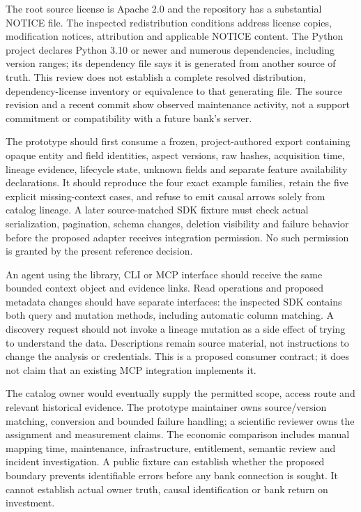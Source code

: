 The root source license is Apache 2.0 and the repository has a substantial
NOTICE file. The inspected redistribution conditions address license copies,
modification notices, attribution and applicable NOTICE content. The Python
project declares Python 3.10 or newer and numerous dependencies, including
version ranges; its dependency file says it is generated from another source
of truth. This review does not establish a complete resolved distribution,
dependency-license inventory or equivalence to that generating file. The
source revision and a recent commit show observed maintenance activity, not
a support commitment or compatibility with a future bank's server.
\citep{exec16_dh_rights}

The prototype should first consume a frozen, project-authored export containing
opaque entity and field identities, aspect versions, raw hashes, acquisition
time, lineage evidence, lifecycle state, unknown fields and separate feature
availability declarations. It should reproduce the four exact example families,
retain the five explicit missing-context cases, and refuse to emit causal arrows
solely from catalog lineage. A later source-matched SDK fixture must check
actual serialization, pagination, schema changes, deletion visibility and
failure behavior before the proposed adapter receives integration permission.
No such permission is granted by the present reference decision.
\citep{exec16_dh_contract}

An agent using the library, CLI or MCP interface should receive the same
bounded context object and evidence links. Read operations and proposed metadata
changes should have separate interfaces: the inspected SDK contains both query
and mutation methods, including automatic column matching. A discovery request
should not invoke a lineage mutation as a side effect of trying to understand
the data. Descriptions remain source material, not instructions to change the
analysis or credentials. This is a proposed consumer contract; it does not
claim that an existing MCP integration implements it.
\citep{exec16_dh_primary,exec16_dh_contract}

The catalog owner would eventually supply the permitted scope, access route
and relevant historical evidence. The prototype maintainer owns source/version
matching, conversion and bounded failure handling; a scientific reviewer owns
the assignment and measurement claims. The economic comparison includes
manual mapping time, maintenance, infrastructure, entitlement, semantic review
and incident investigation. A public fixture can establish whether the proposed
boundary prevents identifiable errors before any bank connection is sought.
It cannot establish actual owner truth, causal identification or bank return
on investment. \citep{exec16_dh_contract}
\label{exec16:datahub-end}


